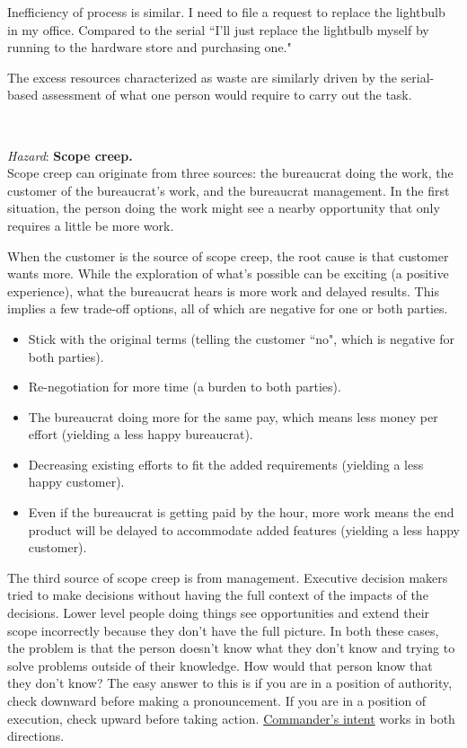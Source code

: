 Inefficiency of process is similar. I need to file a request to replace the lightbulb in my office. Compared to the serial ``I'll just replace the lightbulb myself by running to the hardware store and purchasing one."

The excess resources characterized as waste are similarly driven by the serial-based assessment of what one person would require to carry out the task. 

\ \\
\begin{samepage}
\textit{Hazard}: \textbf{Scope creep.}\label{sec:scope-creep} \\
Scope creep can originate from three sources: the bureaucrat doing the work, the customer of the bureaucrat's work, and the bureaucrat management. In the first situation, the person doing the work might see a nearby opportunity that only requires a little be more work. 
\end{samepage}

When the customer is the source of scope creep, the root cause is that customer wants more. While the exploration of what's possible can be exciting (a positive experience), what the bureaucrat hears is more work and delayed results. This implies a few trade-off options, all of which are negative for one or both parties.
\begin{itemize}
    \item Stick with the original terms (telling the customer ``no", which is negative for both parties).
    \item Re-negotiation for more time (a burden to both parties).
    \item The bureaucrat doing more for the same pay, which means less money per effort (yielding a less happy bureaucrat).
    \item Decreasing existing efforts to fit the added requirements (yielding a less happy customer).
    \item Even if the bureaucrat is getting paid by the hour, more work means the end product will be delayed to accommodate added features (yielding a less happy customer).
\end{itemize}

The third source of scope creep is from management. Executive decision makers tried to make decisions without having the full context of the impacts of the decisions. Lower level people doing things see opportunities and extend their scope incorrectly because they don't have the full picture. In both these cases, the problem is that the person doesn't know what they don't know and trying to solve problems outside of their knowledge. How would that person know that they don't know? The easy answer to this is if you are in a position of authority, check downward before making a pronouncement. If you are in a position of execution, check upward before taking action. \href{https://en.wikipedia.org/wiki/Intent_(military)#Commander's_intent}{Commander's intent}
works in both directions.

